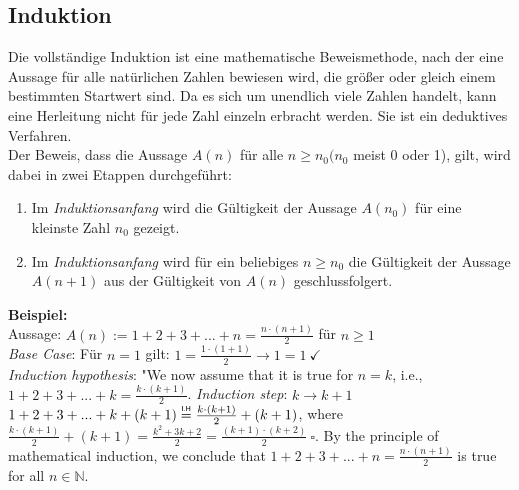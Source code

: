 \documentclass[a4paper]{article}
\newcommand\myEqualOne{\mathrel{\overset{\makebox[0pt]{\mbox{\normalfont\tiny\sffamily I.H}}}{=}}}
\begin{document}
\subsection{Induktion}
    Die vollständige Induktion ist eine mathematische Beweismethode, nach der eine Aussage für alle natürlichen Zahlen bewiesen wird, die größer oder gleich einem bestimmten Startwert sind. Da es sich um unendlich viele Zahlen handelt, kann eine Herleitung nicht für jede Zahl einzeln erbracht werden. Sie ist ein deduktives Verfahren. \\
    Der Beweis, dass die Aussage $A(n)$ für alle $n \geq n_0 (n_0$ meist 0 oder 1), gilt, wird dabei in zwei Etappen durchgeführt:
    \begin{enumerate}
        \item Im \textit{Induktionsanfang} wird die Gültigkeit der Aussage $A(n_0)$ für eine kleinste Zahl $n_0$ gezeigt.
        \item Im \textit{Induktionsanfang} wird für ein beliebiges $n \geq n_0$ die Gültigkeit der Aussage $A(n+1)$ aus der Gültigkeit von $A(n)$ geschlussfolgert.
    \end{enumerate}
    \textbf{Beispiel:} \\
        Aussage: $A(n):= 1 + 2 + 3 + ...+ n = \frac{n \cdot (n+1)}{2}$ für $n \geq 1$ \\
        \textit{Base Case}: Für $n = 1$ gilt: $1 = \frac{1 \cdot (1+1)}{2} \rightarrow 1 = 1 \ \checkmark$ \\
        \textit{Induction hypothesis}: "We now assume that it is true for $n = k$, i.e., $1 + 2 + 3 + ...+ k = \frac{k \cdot (k+1)}{2} $.
        \textit{Induction step}: $k \rightarrow k+1$ \\
        $1 + 2 + 3 + ...+ k + (k+1) \myEqualOne  \frac{k \cdot (k+1)}{2} + (k+1)$, where $\frac{k \cdot (k+1)}{2} + (k+1) = \frac{k^2 + 3k + 2}{2} = \frac{(k+1) \cdot (k+2)}{2} \ \square.$
        By the principle of mathematical induction, we conclude that $ 1 + 2 + 3 + ...+ n = \frac{n \cdot (n+1)}{2}$ is true for all $n \in \mathbb{N}.$
        \\
        
\end{document}

